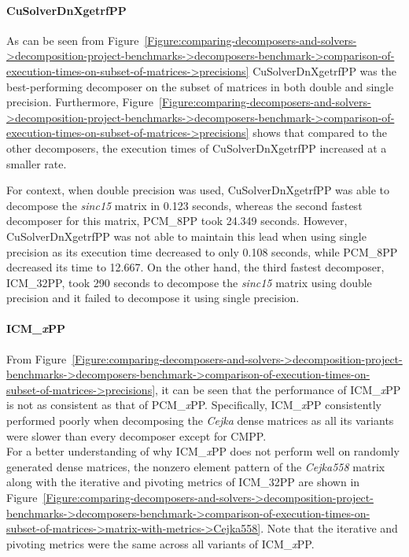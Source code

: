 \paragraph{CuSolverDnXgetrfPP} As can be seen from Figure~\ref{Figure:comparing-decomposers-and-solvers->decomposition-project-benchmarks->decomposers-benchmark->comparison-of-execution-times-on-subset-of-matrices->precisions} CuSolverDnXgetrfPP was the best-performing decomposer on the subset of matrices in both double and single precision.
Furthermore, Figure~\ref{Figure:comparing-decomposers-and-solvers->decomposition-project-benchmarks->decomposers-benchmark->comparison-of-execution-times-on-subset-of-matrices->precisions} shows that compared to the other decomposers, the execution times of CuSolverDnXgetrfPP increased at a smaller rate.

For context, when double precision was used, CuSolverDnXgetrfPP was able to decompose the \textit{sinc15} matrix in 0.123 seconds, whereas the second fastest decomposer for this matrix, PCM\_8PP took 24.349 seconds.
However, CuSolverDnXgetrfPP was not able to maintain this lead when using single precision as its execution time decreased to only 0.108 seconds, while PCM\_8PP decreased its time to 12.667.
On the other hand, the third fastest decomposer, ICM\_32PP, took 290 seconds to decompose the \textit{sinc15} matrix using double precision and it failed to decompose it using single precision.

\paragraph{ICM\_\textit{x}PP} From Figure~\ref{Figure:comparing-decomposers-and-solvers->decomposition-project-benchmarks->decomposers-benchmark->comparison-of-execution-times-on-subset-of-matrices->precisions}, it can be seen that the performance of ICM\_\textit{x}PP is not as consistent as that of PCM\_\textit{x}PP.
Specifically, ICM\_\textit{x}PP consistently performed poorly when decomposing the \textit{Cejka} dense matrices as all its variants were slower than every decomposer except for CMPP.\\
For a better understanding of why ICM\_\textit{x}PP does not perform well on randomly generated dense matrices, the nonzero element pattern of the \textit{Cejka558} matrix along with the iterative and pivoting metrics of ICM\_32PP are shown in Figure~\ref{Figure:comparing-decomposers-and-solvers->decomposition-project-benchmarks->decomposers-benchmark->comparison-of-execution-times-on-subset-of-matrices->matrix-with-metrics->Cejka558}.
Note that the iterative and pivoting metrics were the same across all variants of ICM\_\textit{x}PP.

